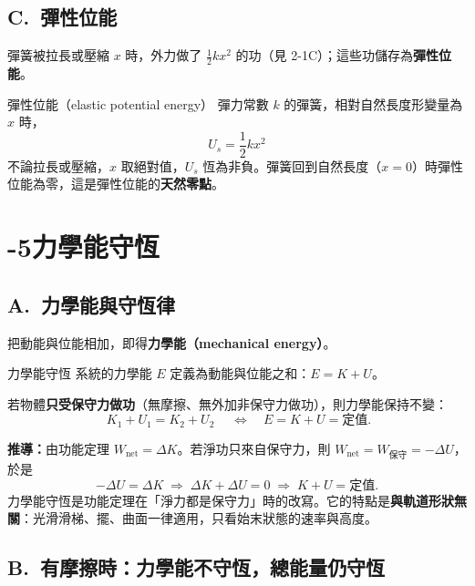 \documentclass[11pt]{article}
\begin{document}
\subsection*{\sffamily C.\ 彈性位能}

彈簧被拉長或壓縮 $x$ 時，外力做了 $\tfrac12kx^2$ 的功（見 2-1C）；這些功儲存為\textbf{彈性位能}。

\begin{補充框}{彈性位能（elastic potential energy）}
彈力常數 $k$ 的彈簧，相對自然長度形變量為 $x$ 時，
$$\boxed{\;U_s=\frac{1}{2}kx^2\;}$$
不論拉長或壓縮，$x$ 取絕對值，$U_s$ 恆為非負。彈簧回到自然長度（$x=0$）時彈性位能為零，這是彈性位能的\textbf{天然零點}。
\end{補充框}

\section*{-5\quad 力學能守恆}

\subsection*{\sffamily A.\ 力學能與守恆律}

把動能與位能相加，即得\textbf{力學能（mechanical energy）}。

\begin{補充框}{力學能守恆}
系統的力學能 $E$ 定義為動能與位能之和：$E=K+U$。

若物體\textbf{只受保守力做功}（無摩擦、無外加非保守力做功），則力學能保持不變：
$$\boxed{\;K_1+U_1=K_2+U_2\;}\quad\Longleftrightarrow\quad E=K+U=\text{定值}.$$

\textbf{推導：}由功能定理 $W_{\text{net}}=\Delta K$。若淨功只來自保守力，則 $W_{\text{net}}=W_{\text{保守}}=-\Delta U$，於是
$$-\Delta U=\Delta K \;\Rightarrow\; \Delta K+\Delta U=0 \;\Rightarrow\; K+U=\text{定值}.$$
力學能守恆是功能定理在「淨力都是保守力」時的改寫。它的特點是\textbf{與軌道形狀無關}：光滑滑梯、擺、曲面一律適用，只看始末狀態的速率與高度。
\end{補充框}


\subsection*{\sffamily B.\ 有摩擦時：力學能不守恆，總能量仍守恆}
\end{document}
